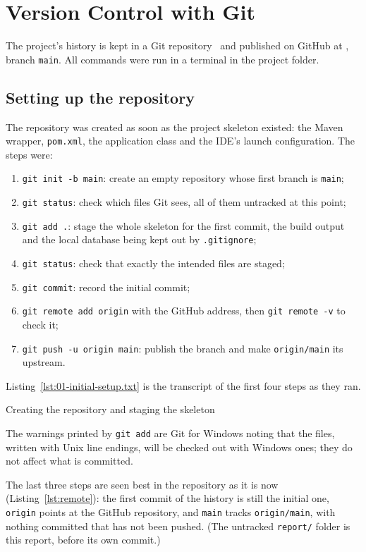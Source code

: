\section{Version Control with Git}\label{sec:git}

The project's history is kept in a Git repository~\cite{progit} and published on GitHub at
\RepoURL, branch \texttt{main}. All commands were run in a terminal in the project folder.

\subsection{Setting up the repository}

The repository was created as soon as the project skeleton existed: the Maven wrapper, \texttt{pom.xml}, the
application class and the IDE's launch configuration. The steps were:
\begin{enumerate}
  \item \texttt{git init -b main}: create an empty repository whose first branch is \texttt{main};
  \item \texttt{git status}: check which files Git sees, all of them untracked at this point;
  \item \texttt{git add .}: stage the whole skeleton for the first commit, the build output and the local database
        being kept out by \texttt{.gitignore};
  \item \texttt{git status}: check that exactly the intended files are staged;
  \item \texttt{git commit}: record the initial commit;
  \item \texttt{git remote add origin} with the GitHub address, then \texttt{git remote -v} to check it;
  \item \texttt{git push -u origin main}: publish the branch and make \texttt{origin/main} its upstream.
\end{enumerate}
Listing~\ref{lst:01-initial-setup.txt} is the transcript of the first four steps as they ran.

  {Creating the repository and staging the skeleton}

The warnings printed by \texttt{git add} are Git for Windows noting that the files, written with Unix line endings,
will be checked out with Windows ones; they do not affect what is committed.

The last three steps are seen best in the repository as it is now (Listing~\ref{lst:remote}): the first commit
of the history is still the initial one, \texttt{origin} points at the GitHub repository, and \texttt{main} tracks
\texttt{origin/main}, with nothing committed that has not been pushed. (The untracked \texttt{report/} folder is
this report, before its own commit.)

